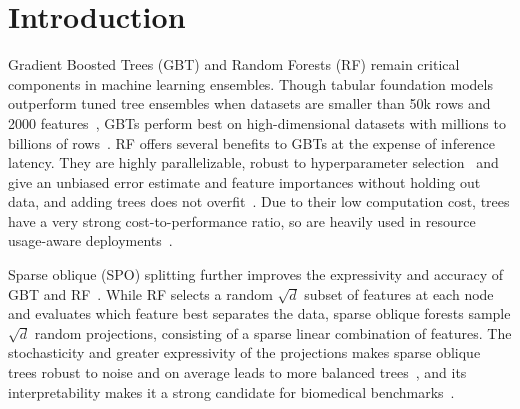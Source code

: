 \documentclass[sigconf,anonymous,review]{acmart}
\begin{document}
\newpage





\newpage

\section{Introduction}

Gradient Boosted Trees (GBT) and Random Forests (RF) remain critical components in machine learning ensembles. Though tabular foundation models outperform tuned tree ensembles when datasets are smaller than 50k rows and 2000 features~\cite{hollmann_accurate_2025,qu2026tabiclv2,grinsztajn2026tabpfn,tabarena,kong2026tabfm}, GBTs perform best on high-dimensional datasets with millions to billions of rows~\cite{ye2026closer}. RF offers several benefits to GBTs at the expense of inference latency. They are highly parallelizable, robust to hyperparameter selection~\cite{probst2019tunability} and give an unbiased error estimate and feature importances without holding out data, and adding trees does not overfit~\cite{breiman}. Due to their low computation cost, trees have a very strong cost-to-performance ratio, so are heavily used in resource usage-aware deployments~\cite{maier2026hapens}.

Sparse oblique (SPO) splitting further improves the expressivity and accuracy of GBT and RF~\cite{tomita2020sparse}. While RF selects a random $\sqrt{d}$ subset of features at each node and evaluates which feature best separates the data, sparse oblique forests sample $\sqrt{d}$ random projections, consisting of a sparse linear combination of features. The stochasticity and greater expressivity of the projections makes sparse oblique trees robust to noise and on average leads to more balanced trees~\cite{tomita2020sparse}, and its interpretability makes it a strong candidate for biomedical benchmarks~\cite{might2}.
\end{document}
